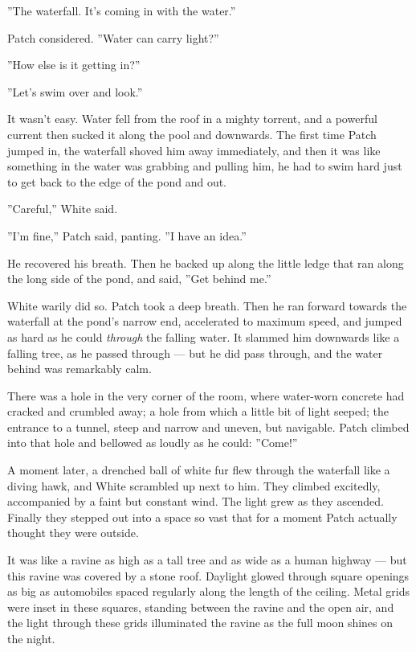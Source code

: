 \documentclass[12pt]{book}
\begin{document}
''The waterfall. It's coming in with the water.''

Patch considered. ''Water can carry light?''

''How else is it getting in?''

''Let's swim over and look.''

It wasn't easy. Water fell from the roof in a mighty torrent, and a
powerful current then sucked it along the pool and downwards. The
first time Patch jumped in, the waterfall shoved him away immediately,
and then it was like something in the water was grabbing and pulling
him, he had to swim hard just to get back to the edge of the pond and
out.

''Careful,'' White said.

''I'm fine,'' Patch said, panting. ''I have an idea.''

He recovered his breath. Then he backed up along the little ledge that
ran along the long side of the pond, and said, ''Get behind me.''

White warily did so. Patch took a deep breath. Then he ran forward
towards the waterfall at the pond's narrow end, accelerated to maximum
speed, and jumped as hard as he could \textit{through }the falling
water. It slammed him downwards like a falling tree, as he passed
through --- but he did pass through, and the water behind was
remarkably calm.

There was a hole in the very corner of the room, where water-worn
concrete had cracked and crumbled away; a hole from which a little bit
of light seeped; the entrance to a tunnel, steep and narrow and
uneven, but navigable. Patch climbed into that hole and bellowed as
loudly as he could: ''Come!''

A moment later, a drenched ball of white fur flew through the
waterfall like a diving hawk, and White scrambled up next to him. They
climbed excitedly, accompanied by a faint but constant wind. The light
grew as they ascended. Finally they stepped out into a space so vast
that for a moment Patch actually thought they were outside.

It was like a ravine as high as a tall tree and as wide as a human
highway --- but this ravine was covered by a stone roof. Daylight
glowed through square openings as big as automobiles spaced regularly
along the length of the ceiling. Metal grids were inset in these
squares, standing between the ravine and the open air, and the light
through these grids illuminated the ravine as the full moon shines on
the night.
\end{document}
